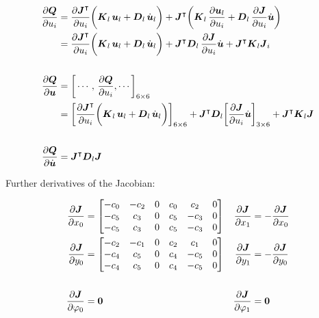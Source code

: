 \begin{align}
\frac{\partial\boldsymbol{Q}}{\partial u_{i}} &= \frac{\partial\boldsymbol{J}^\intercal}{\partial u_{i}}\bigg(\boldsymbol{K}_{l}\,\boldsymbol{u}_{l} + \boldsymbol{D}_{l}\,\dot{\boldsymbol{u}}_{l}\bigg) + \boldsymbol{J}^\intercal\bigg(\boldsymbol{K}_{l}\,\frac{\partial\boldsymbol{u}_{l}}{\partial u_{i}} + \boldsymbol{D}_{l}\,\frac{\partial\boldsymbol{J}}{\partial u_{i}}\dot{\boldsymbol{u}}\bigg) \notag \\
&= \frac{\partial\boldsymbol{J}^\intercal}{\partial u_{i}}\bigg(\boldsymbol{K}_{l}\,\boldsymbol{u}_{l} + \boldsymbol{D}_{l}\,\dot{\boldsymbol{u}}_{l}\bigg) + \boldsymbol{J}^\intercal \boldsymbol{D}_{l}\,\frac{\partial\boldsymbol{J}}{\partial u_{i}}\dot{\boldsymbol{u}} + \boldsymbol{J}^\intercal\boldsymbol{K}_{l}\boldsymbol{J}_{i} \\
\notag \\
\frac{\partial\boldsymbol{Q}}{\partial\boldsymbol{u}} &=
\bigg[\cdots,\,\frac{\partial\boldsymbol{Q}}{\partial u_{i}},\cdots\bigg]_{6 \times 6} \notag \\
&= \bigg[\frac{\partial\boldsymbol{J}^\intercal}{\partial u_{i}}\bigg(\boldsymbol{K}_{l}\,\boldsymbol{u}_{l} + \boldsymbol{D}_{l}\,\dot{\boldsymbol{u}}_{l}\bigg)\bigg]_{6 \times 6} + \boldsymbol{J}^\intercal \boldsymbol{D}_{l}\bigg[\frac{\partial\boldsymbol{J}}{\partial u_{i}}\dot{\boldsymbol{u}}\bigg]_{3 \times 6} + \boldsymbol{J}^\intercal\boldsymbol{K}_{l}\boldsymbol{J} \\
\notag \\
\frac{\partial\boldsymbol{Q}}{\partial\dot{\boldsymbol{u}}} &= \boldsymbol{J}^\intercal\boldsymbol{D}_{l}\boldsymbol{J}
\end{align}

\newpage
Further derivatives of the Jacobian:

\begin{align}
\frac{\partial \boldsymbol{J}}{\partial x_0} &= \begin{bmatrix}
-c_0 & -c_2 & 0 & c_0 &  c_2 & 0 \\
-c_5 &  c_3 & 0 & c_5 & -c_3 & 0 \\
-c_5 &  c_3 & 0 & c_5 & -c_3 & 0
\end{bmatrix} & \frac{\partial \boldsymbol{J}}{\partial x_1} &= -\frac{\partial \boldsymbol{J}}{\partial x_0} \\
\frac{\partial \boldsymbol{J}}{\partial y_0} &= \begin{bmatrix}
-c_2 & -c_1 & 0 & c_2 &  c_1 & 0 \\
-c_4 &  c_5 & 0 & c_4 & -c_5 & 0 \\
-c_4 &  c_5 & 0 & c_4 & -c_5 & 0
\end{bmatrix} & \frac{\partial \boldsymbol{J}}{\partial y_1} &= -\frac{\partial \boldsymbol{J}}{\partial y_0} \\
\notag \\
\frac{\partial \boldsymbol{J}}{\partial \varphi_0} &= \boldsymbol{0} & \frac{\partial \boldsymbol{J}}{\partial \varphi_1} &= \boldsymbol{0}
\end{align}

